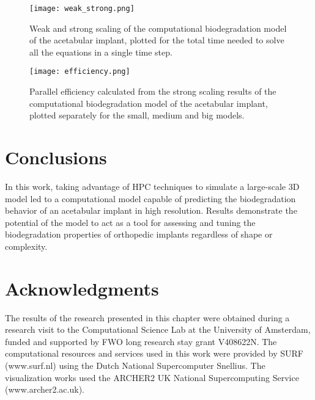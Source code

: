 \begin{figure}[h]
\centering
\medskip
\texttt{[image: weak\_strong.png]}
\caption[Weak and strong scaling of the acetabular implant model]{Weak and strong scaling of the computational biodegradation model of the acetabular implant, plotted for the total time needed to solve all the equations in a single time step.} \label{fig:cup_weak_strong}
\end{figure}

\begin{figure}[h]
\centering
\medskip
\texttt{[image: efficiency.png]}
\caption[Parallel efficiency of the acetabular implant model]{Parallel efficiency calculated from the strong scaling results of the computational biodegradation model of the acetabular implant, plotted separately for the small, medium and big models.} \label{fig:cup_efficiency}
\end{figure}

\clearpage

\section{Conclusions}

In this work, taking advantage of {HPC} techniques to simulate a large-scale 3D model led to a computational model capable of predicting the biodegradation behavior of an acetabular implant in high resolution. Results demonstrate the potential of the model to act as a tool for assessing and tuning the biodegradation properties of orthopedic implants regardless of shape or complexity.

\section*{Acknowledgments}

The results of the research presented in this chapter were obtained during a research visit to the Computational Science Lab at the University of Amsterdam, funded and supported by FWO long research stay grant V408622N. The computational resources and services used in this work were provided by SURF (www.surf.nl) using the Dutch National Supercomputer Snellius. The visualization works used the ARCHER2 UK National Supercomputing Service (www.archer2.ac.uk).


\cleardoublepage
